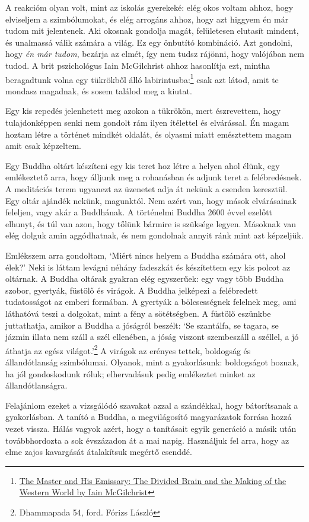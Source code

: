 A reakcióm olyan volt, mint az iskolás gyerekeké: elég okos voltam
ahhoz, hogy elviseljem a szimbólumokat, és elég arrogáns ahhoz, hogy azt
higgyem én már tudom mit jelentenek. Aki okosnak gondolja magát,
felületesen elutasít mindent, és unalmassá válik számára a világ. Ez egy
önbutító kombináció. Azt gondolni, hogy \emph{én már tudom}, bezárja az
elmét, így nem tudsz rájönni, hogy valójában nem tudod. A brit
pszichológus Iain McGilchrist ahhoz hasonlítja ezt, mintha beragadtunk
volna egy tükrökből álló labirintusba:\footnote{\href{https://www.goodreads.com/book/show/6968772-the-master-and-his-emissary}{The
  Master and His Emissary: The Divided Brain and the Making of the
  Western World by Iain McGilchrist}} csak azt látod, amit te mondasz
magadnak, és sosem találod meg a kiutat.

Egy kis repedés jelenhetett meg azokon a tükrökön, mert észrevettem,
hogy tulajdonképpen senki nem gondolt rám ilyen ítélettel és elvárással.
Én magam hoztam létre a történet mindkét oldalát, és olyasmi miatt
emésztettem magam amit csak képzeltem.

Egy Buddha oltárt készíteni egy kis teret hoz létre a helyen ahol élünk,
egy emlékeztető arra, hogy álljunk meg a rohanásban és adjunk teret a
felébredésnek. A meditációs terem ugyanezt az üzenetet adja át nekünk a
csenden keresztül. Egy oltár ajándék nekünk, magunktól. Nem azért van,
hogy mások elvárásainak feleljen, vagy akár a Buddhának. A történelmi
Buddha 2600 évvel ezelőtt elhunyt, és túl van azon, hogy tőlünk bármire
is szüksége legyen. Másoknak van elég dolguk amin aggódhatnak, és nem
gondolnak annyit ránk mint azt képzeljük.

\enlargethispage*{\baselineskip}

Emlékszem arra gondoltam, `Miért nincs helyem a Buddha számára ott, ahol
élek?' Neki is láttam levágni néhány fadeszkát és készítettem egy kis
polcot az oltárnak. A Buddha oltárak gyakran elég egyszerűek: egy vagy
több Buddha szobor, gyertyák, füstölő és virágok. A Buddha jelképezi a
felébredett tudatosságot az emberi formában. A gyertyák a bölcsességnek
felelnek meg, ami láthatóvá teszi a dolgokat, mint a fény a sötétségben.
A füstölő eszünkbe juttathatja, amikor a Buddha a jóságról beszélt: `Se
szantálfa, se tagara, se jázmin illata nem száll a szél ellenében, a
jóság viszont szembeszáll a széllel, a jó áthatja az egész
világot.'\footnote{Dhammapada 54, ford. Fórizs László} A virágok az
erényes tettek, boldogság és állandótlanság szimbólumai. Olyanok, mint a
gyakorlásunk: boldogságot hoznak, ha jól gondoskodunk róluk;
elhervadásuk pedig emlékeztet minket az állandótlanságra.

Felajánlom ezeket a vizsgálódó szavakat azzal a szándékkal, hogy
bátorítsanak a gyakorlásban. A tanító a Buddha, a megvilágosító
magyarázatok forrása hozzá vezet vissza. Hálás vagyok azért, hogy a
tanításait egyik generáció a másik után továbbhordozta a sok évszázadon
át a mai napig. Használjuk fel arra, hogy az elme zajos kavargását
átalakítsuk megértő csenddé.

